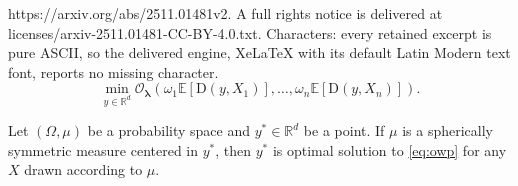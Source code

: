 \documentclass[10pt,a4paper]{amsart}
\newcommand{\D}{\mathrm{D}}
\newcommand{\R}{\mathbb{R}}
\renewcommand{\O}{\mathcal{O}}
\begin{document}
https://arxiv.org/abs/2511.01481v2. A full rights notice is delivered at licenses/arxiv-2511.01481-CC-BY-4.0.txt. Characters: every retained excerpt is pure ASCII, so the delivered engine, XeLaTeX with its default Latin Modern text font, reports no missing character.
\begin{equation}\label{eq:owp}\tag{\rm OWP-SU}
    \min_{y \in \R^d} \O_{\bm{\lambda}}\left(\omega_{1}\mathbb{E}\left[\D\left(y,X_{1}\right)\right],\ldots, \omega_{n}\mathbb{E}\left[\D\left(y,X_{n}\right)\right]\right).
\end{equation}

\begin{lemma}\label{lemma:single-va}
    Let $(\Omega,\mu)$ be a probability space and $y^*\in \R^d$ be a point. If $\mu$ is a spherically symmetric measure centered in $y^*$, then $y^*$ is optimal solution to \ref{eq:owp} for any $X$ drawn according to $\mu$.
\end{lemma}
\end{document}
